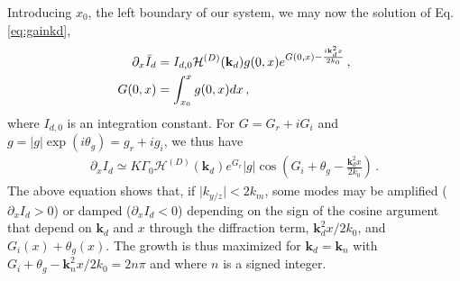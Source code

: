 \documentclass[
 reprint,
 amsmath,amssymb,
 aps,
]{revtex4-1}
\begin{document}
Introducing $x_0$, the left boundary of our system, we may now the solution of Eq. \eqref{eq:gainkd}, 
\begin{align}
\partial_x\Bar{I}_d &=I_{d,0} \mathcal{H}^{(D)}(\mathbf{k}_d) g(0,x)
e^{G(0,x)-\frac{i\mathbf{k}_d^2x }{2k_0}} \, ,\nonumber\\
G(0,x)&=\int_{x_0}^{x}g(0,x) dx \, , \label{eq:dxidkd}
\end{align}
where $I_{d,0}$ is an integration constant. 
For $G=G_r+iG_i$ and $g=\vert g \vert \exp(i\theta_g)=g_r+ig_i$, we thus have
\begin{align}
\partial_x I_d \simeq K\Gamma_0 \mathcal{H}^{(D)}(\mathbf{k}_d)  e^{ G_r} \vert g \vert \cos\left( G_i +\theta_g-\frac{\mathbf{k}_d^2 x }{2k_0} \right) \, . \label{eq:dxidkdf}
\end{align} 
The above equation shows that, if $\vert k_{y/z}\vert <2k_m$, some modes may be amplified ($\partial_x I_d>0$) or damped ($\partial_x I_d<0$) depending on the sign of the cosine argument that depend on $\mathbf{k}_d$ and $x$ through the diffraction term, $\mathbf{k}_d^2 x/2k_0$, and $ G_i(x)+ \theta_g(x)$. 
The growth is thus maximized for $\mathbf{k}_d=\mathbf{k}_n$ with $G_i+ \theta_g-\mathbf{k}_n^2 x /2k_0 = 2n\pi$ and where $n$ is a signed integer. 
\end{document}
